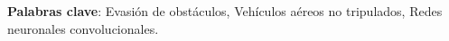 \begin{titlepage}
{}

\noindent \begin{small} \textbf{Palabras clave}: Evasión de obstáculos, Vehículos aéreos no tripulados, Redes neuronales convolucionales. \end{small}


\end{titlepage}
